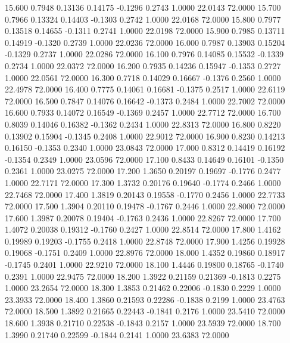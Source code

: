   15.600   0.7948   0.13136   0.14175  -0.1296   0.2743   1.0000  22.0143  72.0000
  15.700   0.7966   0.13324   0.14403  -0.1303   0.2742   1.0000  22.0168  72.0000
  15.800   0.7977   0.13518   0.14655  -0.1311   0.2741   1.0000  22.0198  72.0000
  15.900   0.7985   0.13711   0.14919  -0.1320   0.2739   1.0000  22.0236  72.0000
  16.000   0.7987   0.13903   0.15204  -0.1329   0.2737   1.0000  22.0286  72.0000
  16.100   0.7976   0.14085   0.15532  -0.1339   0.2734   1.0000  22.0372  72.0000
  16.200   0.7935   0.14236   0.15947  -0.1353   0.2727   1.0000  22.0561  72.0000
  16.300   0.7718   0.14029   0.16667  -0.1376   0.2560   1.0000  22.4978  72.0000
  16.400   0.7775   0.14061   0.16681  -0.1375   0.2517   1.0000  22.6119  72.0000
  16.500   0.7847   0.14076   0.16642  -0.1373   0.2484   1.0000  22.7002  72.0000
  16.600   0.7933   0.14072   0.16549  -0.1369   0.2457   1.0000  22.7712  72.0000
  16.700   0.8039   0.14046   0.16382  -0.1362   0.2434   1.0000  22.8313  72.0000
  16.800   0.8220   0.13902   0.15904  -0.1345   0.2408   1.0000  22.9012  72.0000
  16.900   0.8230   0.14213   0.16150  -0.1353   0.2340   1.0000  23.0843  72.0000
  17.000   0.8312   0.14419   0.16192  -0.1354   0.2349   1.0000  23.0596  72.0000
  17.100   0.8433   0.14649   0.16101  -0.1350   0.2361   1.0000  23.0275  72.0000
  17.200   1.3650   0.20197   0.19697  -0.1776   0.2477   1.0000  22.7171  72.0000
  17.300   1.3732   0.20176   0.19640  -0.1774   0.2466   1.0000  22.7468  72.0000
  17.400   1.3819   0.20143   0.19558  -0.1770   0.2456   1.0000  22.7733  72.0000
  17.500   1.3904   0.20110   0.19478  -0.1767   0.2446   1.0000  22.8000  72.0000
  17.600   1.3987   0.20078   0.19404  -0.1763   0.2436   1.0000  22.8267  72.0000
  17.700   1.4072   0.20038   0.19312  -0.1760   0.2427   1.0000  22.8514  72.0000
  17.800   1.4162   0.19989   0.19203  -0.1755   0.2418   1.0000  22.8748  72.0000
  17.900   1.4256   0.19928   0.19068  -0.1751   0.2409   1.0000  22.8976  72.0000
  18.000   1.4352   0.19860   0.18917  -0.1745   0.2401   1.0000  22.9210  72.0000
  18.100   1.4446   0.19800   0.18765  -0.1740   0.2391   1.0000  22.9475  72.0000
  18.200   1.3922   0.21159   0.21369  -0.1813   0.2275   1.0000  23.2654  72.0000
  18.300   1.3853   0.21462   0.22006  -0.1830   0.2229   1.0000  23.3933  72.0000
  18.400   1.3860   0.21593   0.22286  -0.1838   0.2199   1.0000  23.4763  72.0000
  18.500   1.3892   0.21665   0.22443  -0.1841   0.2176   1.0000  23.5410  72.0000
  18.600   1.3938   0.21710   0.22538  -0.1843   0.2157   1.0000  23.5939  72.0000
  18.700   1.3990   0.21740   0.22599  -0.1844   0.2141   1.0000  23.6383  72.0000
